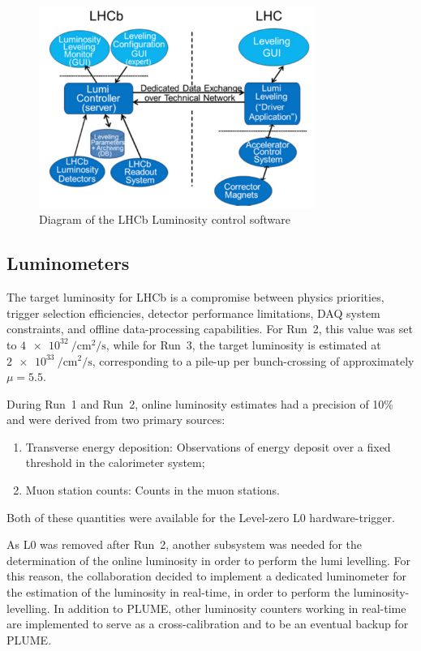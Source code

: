 \begin{figure}
    \centering
    \includegraphics[width=0.8\textwidth]{figures/lumi_control.png}
    \caption{Diagram of the LHCb Luminosity control software}
    \label{fig:lumi-control}
\end{figure}

\subsection{Luminometers}\label{sec:luminometers}
The target luminosity for LHCb is a compromise between physics priorities, trigger selection efficiencies, detector performance limitations, DAQ system constraints, and offline data-processing capabilities. For Run~2, this value was set to $\SI{4e32}{\per\centi\meter\squared\per\second}$, while for Run~3, the target luminosity is estimated at $\SI{2e33}{\per\centi\meter\squared\per\second}$, corresponding to a pile-up per bunch-crossing of approximately $\mu = 5.5$.

During Run~1 and Run~2, online luminosity estimates had a precision of 10\% and were derived from two primary sources: 
\begin{enumerate}
    \item Transverse energy deposition: Observations of energy deposit over a fixed threshold in the calorimeter system;
    \item Muon station counts: Counts in the muon stations.
\end{enumerate}
Both of these quantities were available for the Level-zero L$0$ hardware-trigger.

As L$0$ was removed after Run~2, another subsystem was needed for the determination of the online luminosity in order to perform the lumi levelling. For this reason, the collaboration decided to implement a dedicated luminometer for the estimation of the luminosity in real-time, in order to perform the luminosity-levelling. In addition to PLUME, other luminosity counters working in real-time are implemented to serve as a cross-calibration and to be an eventual backup for PLUME.

